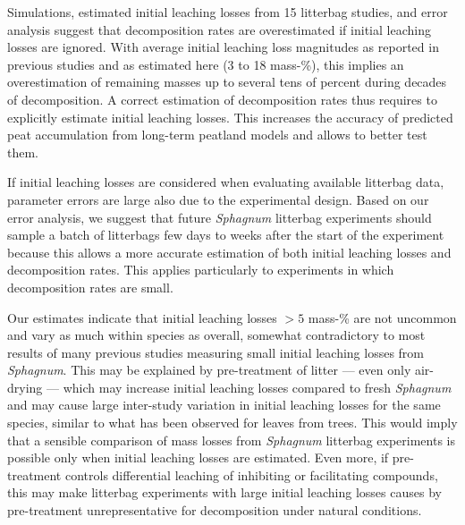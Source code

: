 \documentclass[bg, manuscript]{copernicus}
\begin{document}
\conclusions[Conclusions]

Simulations, estimated initial leaching losses from 15 litterbag studies, and error analysis suggest that decomposition rates are overestimated if initial leaching losses are ignored. With average initial leaching loss magnitudes as reported in previous studies and as estimated here (3 to 18 mass-\%), this implies an overestimation of remaining masses up to several tens of percent during decades of decomposition. A correct estimation of decomposition rates thus requires to explicitly estimate initial leaching losses. This increases the accuracy of predicted peat accumulation from long-term peatland models and allows to better test them.

If initial leaching losses are considered when evaluating available litterbag data, parameter errors are large also due to the experimental design. Based on our error analysis, we suggest that future \emph{Sphagnum} litterbag experiments should sample a batch of litterbags few days to weeks after the start of the experiment because this allows a more accurate estimation of both initial leaching losses and decomposition rates. This applies particularly to experiments in which decomposition rates are small.

Our estimates indicate that initial leaching losses \(>5\) mass-\% are not uncommon and vary as much within species as overall, somewhat contradictory to most results of many previous studies measuring small initial leaching losses from \emph{Sphagnum}. This may be explained by pre-treatment of litter --- even only air-drying --- which may increase initial leaching losses compared to fresh \emph{Sphagnum} and may cause large inter-study variation in initial leaching losses for the same species, similar to what has been observed for leaves from trees. This would imply that a sensible comparison of mass losses from \emph{Sphagnum} litterbag experiments is possible only when initial leaching losses are estimated. Even more, if pre-treatment controls differential leaching of inhibiting or facilitating compounds, this may make litterbag experiments with large initial leaching losses causes by pre-treatment unrepresentative for decomposition under natural conditions.



\end{document}
